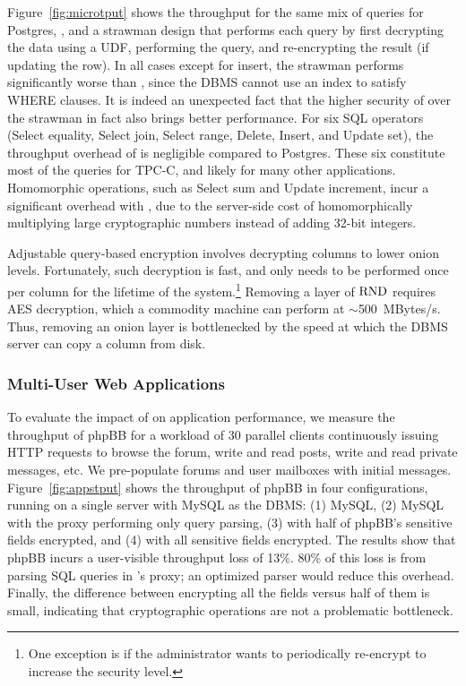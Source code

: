 Figure~\ref{fig:microtput} shows the throughput for the same mix of
queries for Postgres, \name, and a strawman design that performs each
query by first decrypting the data using a UDF, performing the query,
and re-encrypting the result (if updating the row).  In all cases
except for insert, the strawman performs significantly worse than
\name, since the DBMS cannot use an index to satisfy WHERE clauses. It
is indeed an unexpected fact that the higher security of \name{} over
the strawman in fact also brings better performance. For six SQL
operators (Select equality, Select join, Select range, Delete, Insert,
and Update set), the throughput overhead of \name is negligible
compared to Postgres.  These six constitute most of the queries for
TPC-C, and likely for many other applications.  Homomorphic
operations, such as Select sum and Update increment, incur a
significant overhead with \name, due to the server-side cost of
homomorphically multiplying large cryptographic numbers instead of
adding 32-bit integers.





Adjustable query-based encryption involves decrypting columns to lower
onion levels.  Fortunately, such decryption is fast, and only needs to be
performed once per column for the lifetime of the system.\footnote{One
exception is if the administrator wants to periodically re-encrypt to
increase the security level.}  Removing a layer of $\textrm{RND}$ requires AES
decryption, which a commodity machine can perform at $\sim$500~MBytes/s.
Thus, removing an onion layer is bottlenecked by the speed at which the
DBMS server can copy a column from disk.


\subsubsection{Multi-User Web Applications}
\label{s:evalapps}

To evaluate the impact of \name{} on application performance, we
measure the throughput of phpBB for a workload of 30 parallel clients
continuously issuing HTTP requests to browse the forum, write and read
posts, write and read private messages, etc.  We pre-populate forums
and user mailboxes with initial messages.  Figure~\ref{fig:appstput}
shows the throughput of phpBB in four configurations, running on a
single server with MySQL as the DBMS: (1) MySQL, (2) MySQL with the
proxy performing only query parsing, (3) \name with half of phpBB's
sensitive fields encrypted, and (4) \name with all sensitive fields
encrypted.  The results show that phpBB incurs a user-visible
throughput loss of 13\%.  80\% of this loss is from parsing SQL
queries in \name's proxy; an optimized parser would reduce this
overhead.  Finally, the difference between encrypting all the fields
versus half of them is small, indicating that cryptographic operations
are not a problematic bottleneck.

